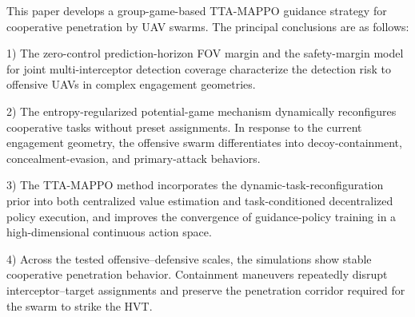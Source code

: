 \documentclass{cja}
\begin{document}
This paper develops a group-game-based TTA-MAPPO guidance strategy for cooperative penetration by UAV swarms. The principal conclusions are as follows:

1) The zero-control prediction-horizon FOV margin and the safety-margin model for joint multi-interceptor detection coverage characterize the detection risk to offensive UAVs in complex engagement geometries.

2) The entropy-regularized potential-game mechanism dynamically reconfigures cooperative tasks without preset assignments. In response to the current engagement geometry, the offensive swarm differentiates into decoy-containment, concealment-evasion, and primary-attack behaviors.

3) The TTA-MAPPO method incorporates the dynamic-task-reconfiguration prior into both centralized value estimation and task-conditioned decentralized policy execution, and improves the convergence of guidance-policy training in a high-dimensional continuous action space.

4) Across the tested offensive--defensive scales, the simulations show stable cooperative penetration behavior. Containment maneuvers repeatedly disrupt interceptor--target assignments and preserve the penetration corridor required for the swarm to strike the HVT.
\end{document}
